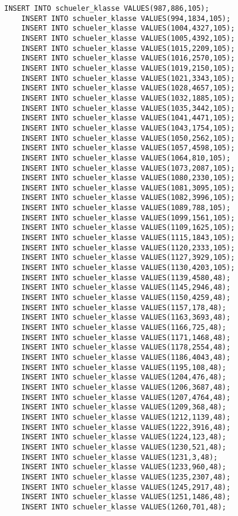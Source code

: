 \begin{lstlisting}[breaklines=True, numbers=none, basicstyle=\tiny, keepspaces=false]
	INSERT INTO schueler_klasse VALUES(987,886,105);
	INSERT INTO schueler_klasse VALUES(994,1834,105);
	INSERT INTO schueler_klasse VALUES(1004,4327,105);
	INSERT INTO schueler_klasse VALUES(1005,4392,105);
	INSERT INTO schueler_klasse VALUES(1015,2209,105);
	INSERT INTO schueler_klasse VALUES(1016,2570,105);
	INSERT INTO schueler_klasse VALUES(1019,2150,105);
	INSERT INTO schueler_klasse VALUES(1021,3343,105);
	INSERT INTO schueler_klasse VALUES(1028,4657,105);
	INSERT INTO schueler_klasse VALUES(1032,1885,105);
	INSERT INTO schueler_klasse VALUES(1035,3442,105);
	INSERT INTO schueler_klasse VALUES(1041,4471,105);
	INSERT INTO schueler_klasse VALUES(1043,1754,105);
	INSERT INTO schueler_klasse VALUES(1050,2562,105);
	INSERT INTO schueler_klasse VALUES(1057,4598,105);
	INSERT INTO schueler_klasse VALUES(1064,810,105);
	INSERT INTO schueler_klasse VALUES(1073,2087,105);
	INSERT INTO schueler_klasse VALUES(1080,2330,105);
	INSERT INTO schueler_klasse VALUES(1081,3095,105);
	INSERT INTO schueler_klasse VALUES(1082,3996,105);
	INSERT INTO schueler_klasse VALUES(1089,788,105);
	INSERT INTO schueler_klasse VALUES(1099,1561,105);
	INSERT INTO schueler_klasse VALUES(1109,1625,105);
	INSERT INTO schueler_klasse VALUES(1115,1843,105);
	INSERT INTO schueler_klasse VALUES(1120,2333,105);
	INSERT INTO schueler_klasse VALUES(1127,3929,105);
	INSERT INTO schueler_klasse VALUES(1130,4203,105);
	INSERT INTO schueler_klasse VALUES(1139,4580,48);
	INSERT INTO schueler_klasse VALUES(1145,2946,48);
	INSERT INTO schueler_klasse VALUES(1150,4259,48);
	INSERT INTO schueler_klasse VALUES(1157,178,48);
	INSERT INTO schueler_klasse VALUES(1163,3693,48);
	INSERT INTO schueler_klasse VALUES(1166,725,48);
	INSERT INTO schueler_klasse VALUES(1171,1468,48);
	INSERT INTO schueler_klasse VALUES(1178,2554,48);
	INSERT INTO schueler_klasse VALUES(1186,4043,48);
	INSERT INTO schueler_klasse VALUES(1195,108,48);
	INSERT INTO schueler_klasse VALUES(1204,476,48);
	INSERT INTO schueler_klasse VALUES(1206,3687,48);
	INSERT INTO schueler_klasse VALUES(1207,4764,48);
	INSERT INTO schueler_klasse VALUES(1209,368,48);
	INSERT INTO schueler_klasse VALUES(1212,1139,48);
	INSERT INTO schueler_klasse VALUES(1222,3916,48);
	INSERT INTO schueler_klasse VALUES(1224,123,48);
	INSERT INTO schueler_klasse VALUES(1230,521,48);
	INSERT INTO schueler_klasse VALUES(1231,3,48);
	INSERT INTO schueler_klasse VALUES(1233,960,48);
	INSERT INTO schueler_klasse VALUES(1235,2307,48);
	INSERT INTO schueler_klasse VALUES(1245,2917,48);
	INSERT INTO schueler_klasse VALUES(1251,1486,48);
	INSERT INTO schueler_klasse VALUES(1260,701,48);

\end{lstlisting}
